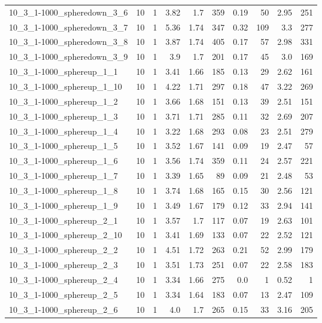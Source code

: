 \begin{center}
\begin{scriptsize}
\begin{longtable}{lrrrrrrrrr}
10\_3\_1-1000\_spheredown\_3\_6 & 10 & 1 & 3.82 & 1.7 & 359 & 0.19 & 50 & 2.95 & 251\\
10\_3\_1-1000\_spheredown\_3\_7 & 10 & 1 & 5.36 & 1.74 & 347 & 0.32 & 109 & 3.3 & 277\\
10\_3\_1-1000\_spheredown\_3\_8 & 10 & 1 & 3.87 & 1.74 & 405 & 0.17 & 57 & 2.98 & 331\\
10\_3\_1-1000\_spheredown\_3\_9 & 10 & 1 & 3.9 & 1.7 & 201 & 0.17 & 45 & 3.0 & 169\\
10\_3\_1-1000\_sphereup\_1\_1 & 10 & 1 & 3.41 & 1.66 & 185 & 0.13 & 29 & 2.62 & 161\\
10\_3\_1-1000\_sphereup\_1\_10 & 10 & 1 & 4.22 & 1.71 & 297 & 0.18 & 47 & 3.22 & 269\\
10\_3\_1-1000\_sphereup\_1\_2 & 10 & 1 & 3.66 & 1.68 & 151 & 0.13 & 39 & 2.51 & 151\\
10\_3\_1-1000\_sphereup\_1\_3 & 10 & 1 & 3.71 & 1.71 & 285 & 0.11 & 32 & 2.69 & 207\\
10\_3\_1-1000\_sphereup\_1\_4 & 10 & 1 & 3.22 & 1.68 & 293 & 0.08 & 23 & 2.51 & 279\\
10\_3\_1-1000\_sphereup\_1\_5 & 10 & 1 & 3.52 & 1.67 & 141 & 0.09 & 19 & 2.47 & 57\\
10\_3\_1-1000\_sphereup\_1\_6 & 10 & 1 & 3.56 & 1.74 & 359 & 0.11 & 24 & 2.57 & 221\\
10\_3\_1-1000\_sphereup\_1\_7 & 10 & 1 & 3.39 & 1.65 & 89 & 0.09 & 21 & 2.48 & 53\\
10\_3\_1-1000\_sphereup\_1\_8 & 10 & 1 & 3.74 & 1.68 & 165 & 0.15 & 30 & 2.56 & 121\\
10\_3\_1-1000\_sphereup\_1\_9 & 10 & 1 & 3.49 & 1.67 & 179 & 0.12 & 33 & 2.94 & 141\\
10\_3\_1-1000\_sphereup\_2\_1 & 10 & 1 & 3.57 & 1.7 & 117 & 0.07 & 19 & 2.63 & 101\\
10\_3\_1-1000\_sphereup\_2\_10 & 10 & 1 & 3.41 & 1.69 & 133 & 0.07 & 22 & 2.52 & 121\\
10\_3\_1-1000\_sphereup\_2\_2 & 10 & 1 & 4.51 & 1.72 & 263 & 0.21 & 52 & 2.99 & 179\\
10\_3\_1-1000\_sphereup\_2\_3 & 10 & 1 & 3.51 & 1.73 & 251 & 0.07 & 22 & 2.58 & 183\\
10\_3\_1-1000\_sphereup\_2\_4 & 10 & 1 & 3.34 & 1.66 & 275 & 0.0 & 1 & 0.52 & 1\\
10\_3\_1-1000\_sphereup\_2\_5 & 10 & 1 & 3.34 & 1.64 & 183 & 0.07 & 13 & 2.47 & 109\\
10\_3\_1-1000\_sphereup\_2\_6 & 10 & 1 & 4.0 & 1.7 & 265 & 0.15 & 33 & 3.16 & 205\\

\end{longtable}
\end{scriptsize}
\end{center}
